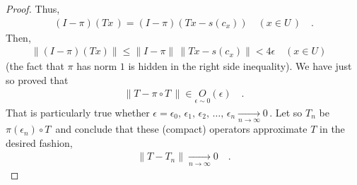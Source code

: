 \begin{proof}
Thus,
\begin{align}
(I-\pi) (Tx\,)= (I-\pi ) (Tx - s(c_x)) \quad (x\in U\,)\quad .
\end{align}
Then,
\begin{align}
\|( I- \pi )(T x) \| \leq \| I- \pi \| \, \| Tx -s(c_x)\| < 4 \epsilon  \quad (x\in U)\quad 
\end{align}
(the fact that $\pi$ has norm $1$ is hidden in the right side inequality). We have just so proved that 
\begin{align}
\| T-\pi\circ T\, \| \in \underset{\epsilon \sim 0}{O}(\epsilon) \quad . 
\end{align}
That is particularly true whether $\epsilon=\epsilon_0,\, \epsilon_1,\, \epsilon_2,\, \dots ,\, \epsilon_n \underset{n\to \infty}{\longrightarrow} 0\,$. Let so $T_n$ be $ \pi(\epsilon_n) \circ T\,$ and conclude that these (compact) operators approximate $T$ in the desired fashion, \ie
\begin{align}
\| T-T_n \| \underset{n \to \infty}{\longrightarrow} 0\quad .
\end{align}
\end{proof}
